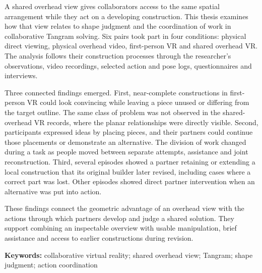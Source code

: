 A shared overhead view gives collaborators access to the same spatial arrangement while they act on a developing construction. This thesis examines how that view relates to shape judgment and the coordination of work in collaborative Tangram solving. Six pairs took part in four conditions: physical direct viewing, physical overhead video, first-person VR and shared overhead VR. The analysis follows their construction processes through the researcher's observations, video recordings, selected action and pose logs, questionnaires and interviews.

Three connected findings emerged. First, near-complete constructions in first-person VR could look convincing while leaving a piece unused or differing from the target outline. The same class of problem was not observed in the shared-overhead VR records, where the planar relationships were directly visible. Second, participants expressed ideas by placing pieces, and their partners could continue those placements or demonstrate an alternative. The division of work changed during a task as people moved between separate attempts, assistance and joint reconstruction. Third, several episodes showed a partner retaining or extending a local construction that its original builder later revised, including cases where a correct part was lost. Other episodes showed direct partner intervention when an alternative was put into action.

These findings connect the geometric advantage of an overhead view with the actions through which partners develop and judge a shared solution. They support combining an inspectable overview with usable manipulation, brief assistance and access to earlier constructions during revision.

\vspace{0.6em}
\noindent\textbf{Keywords:} collaborative virtual reality; shared overhead view; Tangram; shape judgment; action coordination

\clearpage
\tableofcontents
\clearpage
\listoffigures
\clearpage
\listoftables
